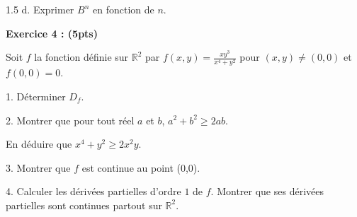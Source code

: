 \documentclass[12pt]{article}
\begin{document}
\begin{spacing}{1.5}
d. Exprimer $B^n$ en fonction de $n$.

\textbf{Exercice 4 : (5pts)}

Soit $f$ la fonction définie sur $\mathbb{R}^2$ par $f(x,y) = \frac{xy^3}{x^4 + y^2}$ pour $(x,y)\neq(0,0)$ et $f(0,0) = 0$.

1. Déterminer $D_f$.

2. Montrer que pour tout réel $a$ et $b$, $a^2 + b^2\geq 2ab$. 

En déduire que $x^4+y^2\geq 2x^2y$. 


3. Montrer que $f$ est continue au point (0,0).

4. Calculer les dérivées partielles d'ordre $1$ de $f$. Montrer que ses dérivées partielles sont continues partout sur $\mathbb{R}^2$.


\medskip

\end{spacing}
\end{document}
